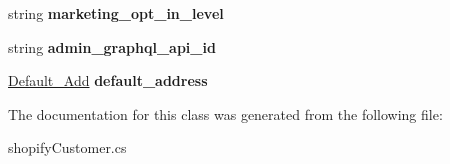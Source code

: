 \begin{DoxyCompactItemize}
\item 
\mbox{\label{class_nexus_1_1shopify_customer_1_1_customers_a41bf4da42d7987c77f347d322bac8043}} 
string {\bfseries marketing\+\_\+opt\+\_\+in\+\_\+level}
\item 
\mbox{\label{class_nexus_1_1shopify_customer_1_1_customers_aa6403ea10b5736a83819f8971f1370c9}} 
string {\bfseries admin\+\_\+graphql\+\_\+api\+\_\+id}
\item 
\mbox{\label{class_nexus_1_1shopify_customer_1_1_customers_a9671d04d935d1601ffe36610ae7a05ab}} 
\mbox{\hyperlink{class_nexus_1_1shopify_customer_1_1_default___add}{Default\+\_\+\+Add}} {\bfseries default\+\_\+address}
\end{DoxyCompactItemize}


The documentation for this class was generated from the following file\+:\begin{DoxyCompactItemize}
\item 
shopify\+Customer.\+cs\end{DoxyCompactItemize}
